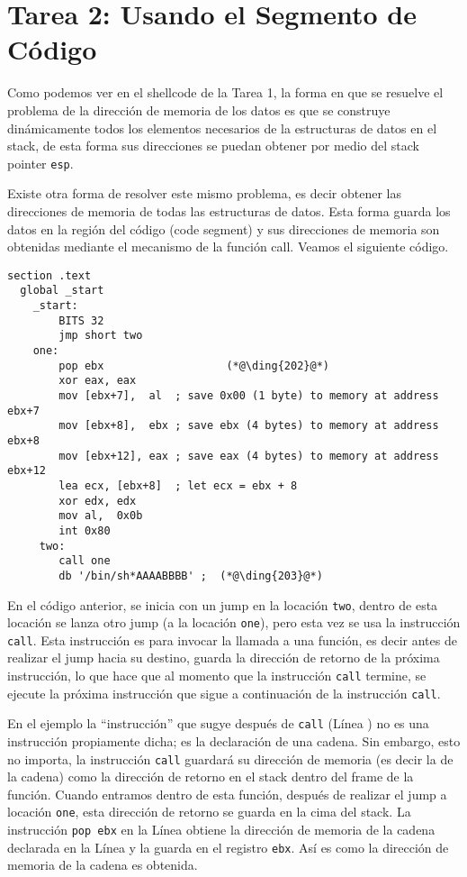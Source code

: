 \section{Tarea 2: Usando el Segmento de Código}

Como podemos ver en el shellcode de la Tarea 1, la forma en que se resuelve el problema de la dirección de memoria de los datos es que se construye dinámicamente todos los elementos necesarios de la estructuras de datos en el stack, de esta forma sus direcciones se puedan obtener por medio del stack pointer \texttt{esp}.

Existe otra forma de resolver este mismo problema, es decir obtener las direcciones de memoria de todas las estructuras de datos. Esta forma guarda los datos en la región del código (code segment) y sus direcciones de memoria son obtenidas mediante el mecanismo de la función call. Veamos el siguiente código.


\begin{lstlisting}[caption={\texttt{mysh2.s}}]
section .text
  global _start
    _start:
        BITS 32
        jmp short two
    one:
        pop ebx                   (*@\ding{202}@*)
        xor eax, eax
        mov [ebx+7],  al  ; save 0x00 (1 byte) to memory at address ebx+7
        mov [ebx+8],  ebx ; save ebx (4 bytes) to memory at address ebx+8
        mov [ebx+12], eax ; save eax (4 bytes) to memory at address ebx+12
        lea ecx, [ebx+8]  ; let ecx = ebx + 8
        xor edx, edx
        mov al,  0x0b
        int 0x80
     two:
        call one
        db '/bin/sh*AAAABBBB' ;  (*@\ding{203}@*)
\end{lstlisting}

En el código anterior, se inicia con un jump en la locación \texttt{two}, dentro de esta locación se lanza otro jump (a la locación \texttt{one}), pero esta vez se usa la instrucción \texttt{call}. Esta instrucción es para invocar la llamada a una función, es decir antes de realizar el jump hacia su destino, guarda la dirección de retorno de la próxima instrucción, lo que hace que al momento que la instrucción \texttt{call} termine, se ejecute la próxima instrucción que sigue a continuación de la instrucción \texttt{call}.

En el ejemplo la ``instrucción'' que sugye después de \texttt{call} (Línea  ) no es una instrucción propiamente dicha; es la declaración de una cadena. Sin embargo, esto no importa, la instrucción \texttt{call} guardará su dirección de memoria (es decir la de la cadena) como la dirección de retorno en el stack dentro del frame de la función. Cuando entramos dentro de esta función, después de realizar el jump a locación \texttt{one}, esta dirección de retorno se guarda en la cima del stack. La instrucción \texttt{pop ebx} en la Línea  obtiene la dirección de memoria de la cadena declarada en la Línea  y la guarda en el registro \texttt{ebx}. Así es como la dirección de memoria de la cadena es obtenida.

